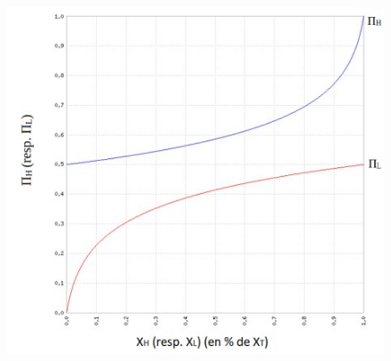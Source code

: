 \documentclass[12pt,a4paper]{article}%
\begin{document}
\begin{appendix}
\begin{figure}[h]
	\includegraphics[width=1.0\textwidth]{figures/Potentiels.jpg}
\end{figure} 


\end{appendix}
\end{document}
